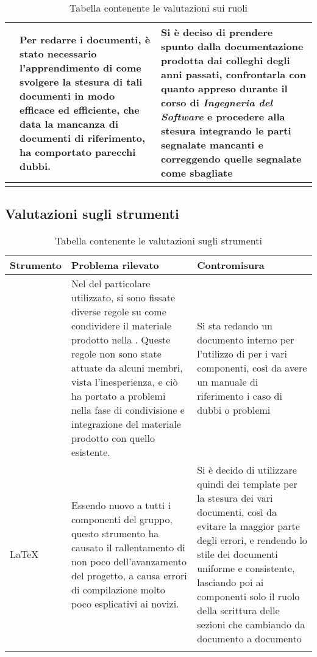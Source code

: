 \begin{center}
\begin{longtable}{|p{3cm}|p{6cm}|p{6cm}|}
			\glock{Amministratore}
	 		&
			Per redarre i documenti, è stato necessario l'apprendimento di come svolgere la stesura di tali documenti in modo efficace ed efficiente, che data la mancanza di documenti di riferimento, ha comportato parecchi dubbi.
	 		&
			Si è deciso di prendere spunto dalla documentazione prodotta dai colleghi degli anni passati, confrontarla con quanto appreso durante il corso di \textit{Ingegneria del Software} e procedere alla stesura integrando le parti segnalate mancanti e correggendo quelle segnalate come sbagliate \\
			\hline
			\rowcolor{white}
			\caption{Tabella contenente le valutazioni sui ruoli}
			\end{longtable}
		\end{center}


	\subsection{Valutazioni sugli strumenti}

		\begin{center}
			\begin{longtable}{|p{3cm}|p{6cm}|p{6cm}|}
			\hline
			\rowcolor{lighter-grayer}
			\textbf{Strumento} & \textbf{Problema rilevato} & \textbf{Contromisura}\\
			\hline
			\endfirsthead

			\hline
			\glock{Version Control System}
	 		&
			Nel \glock{way of working} del particolare \glock{VCS} utilizzato, si sono fissate diverse regole su come condividere il materiale prodotto nella \glock{repository}. Queste regole non sono state attuate da alcuni membri, vista l'inesperienza, e ciò ha portato a problemi nella fase di condivisione e integrazione del materiale prodotto con quello esistente.
		 	&
			Si sta redando un documento interno per l'utilizzo di \glock{Github} per i vari componenti, così da avere un manuale di riferimento i caso di dubbi o problemi  \\
			\hline
			\LaTeX
	 		&
			Essendo nuovo a tutti i componenti del gruppo, questo strumento ha causato il rallentamento di non poco dell'avanzamento del progetto, a causa errori di compilazione molto poco esplicativi ai novizi.
	 		&
			Si è decido di utilizzare quindi dei template per la stesura dei vari documenti, così da evitare la maggior parte degli errori, e rendendo lo stile dei documenti uniforme e consistente, lasciando poi ai componenti solo il ruolo della scrittura delle sezioni che cambiando da documento a documento \\
			\hline
			\rowcolor{white}
			\caption{Tabella contenente le valutazioni sugli strumenti}
			\end{longtable}
		\end{center}
